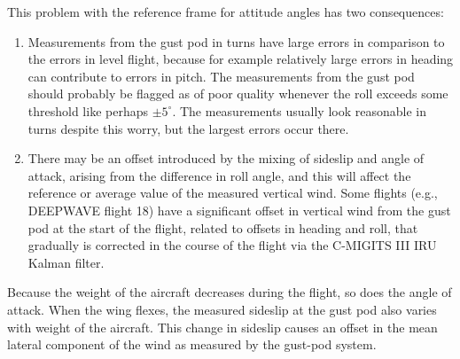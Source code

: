 \documentclass[12pt,twoside,english]{article}\usepackage[]{graphicx}\usepackage[]{color}
\let\OrgIndex\index
\renewcommand*{\index}[1]{\OrgIndex{#1}}
\begin{document}
{{This problem with the reference frame for attitude angles has two consequences:  
\begin{enumerate}
\item Measurements from the gust pod in turns have large errors in comparison to the errors in level flight, because for example relatively large errors in heading can contribute to errors in pitch. The measurements from the gust pod should probably be flagged as of poor quality whenever the roll exceeds some threshold like perhaps $\pm5^{\circ}$. The measurements usually look reasonable in turns despite this worry, but the largest errors occur there.  
\item There may be an offset introduced by the mixing of sideslip and angle of attack, arising from the difference in roll angle, and this will affect the reference or average value of the measured vertical wind. Some flights (e.g., DEEPWAVE flight 18) have a significant offset in vertical wind from the gust pod at the start of the flight, related to offsets in heading and roll, that gradually is corrected in the course of the flight via the C-MIGITS III IRU Kalman filter.  
\end{enumerate}
Because the weight of the aircraft decreases during the flight, so does the angle of attack. When the wing flexes, the measured sideslip at the gust pod also varies with weight of the aircraft. This change in sideslip causes an offset in the mean lateral component of the wind as measured by the gust-pod system. 

}}
\end{document}
